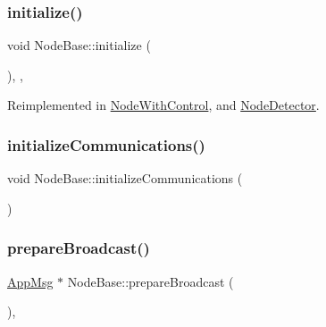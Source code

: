 \subsubsection{\texorpdfstring{initialize()}{initialize()}}
{\footnotesize\ttfamily void Node\+Base\+::initialize (\begin{DoxyParamCaption}{ }\end{DoxyParamCaption})\hspace{0.3cm}{\ttfamily [override]}, {\ttfamily [protected]}, {\ttfamily [virtual]}}



Reimplemented in \hyperlink{class_node_with_control_a08c8e80fd67b52c51c642d7c66fe729c}{Node\+With\+Control}, and \hyperlink{class_node_detector_aefa188ab0657837b1b57f24674d3ef22}{Node\+Detector}.

\mbox{\label{class_node_base_a2077b2a599f55050603268dbf8fff6a7}} 
\subsubsection{\texorpdfstring{initialize\+Communications()}{initializeCommunications()}}
{\footnotesize\ttfamily void Node\+Base\+::initialize\+Communications (\begin{DoxyParamCaption}{ }\end{DoxyParamCaption})\hspace{0.3cm}{\ttfamily [protected]}}

\mbox{\label{class_node_base_a66c1dee9d15119bc3e68da71067ff6cd}} 
\subsubsection{\texorpdfstring{prepare\+Broadcast()}{prepareBroadcast()}}
{\footnotesize\ttfamily \hyperlink{class_app_msg}{App\+Msg} $\ast$ Node\+Base\+::prepare\+Broadcast (\begin{DoxyParamCaption}{ }\end{DoxyParamCaption})\hspace{0.3cm}{\ttfamily [protected]}, {\ttfamily [virtual]}}



